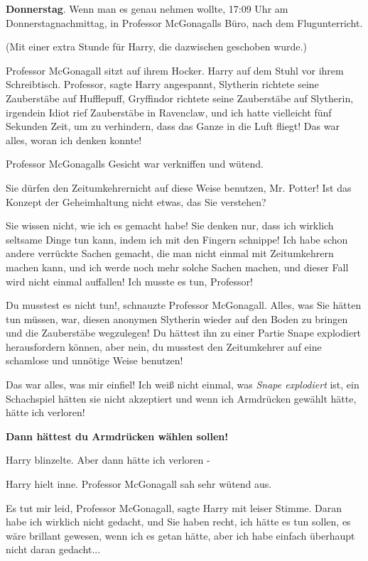 \textbf{Donnerstag}. Wenn man es genau nehmen wollte, 17:09 Uhr am
Donnerstagnachmittag, in Professor McGonagalls Büro, nach dem Flugunterricht.

(Mit einer extra Stunde für Harry, die dazwischen geschoben wurde.)

Professor McGonagall sitzt auf ihrem Hocker. Harry auf dem Stuhl vor ihrem
Schreibtisch. \glqq Professor\grqq{}, sagte Harry angespannt, \glqq Slytherin
richtete seine Zauberstäbe auf Hufflepuff, Gryffindor richtete seine Zauberstäbe
auf Slytherin, irgendein Idiot rief Zauberstäbe in Ravenclaw, und ich hatte
vielleicht fünf Sekunden Zeit, um zu verhindern, dass das Ganze in die Luft
fliegt! Das war alles, woran ich denken konnte!\grqq{}

Professor McGonagalls Gesicht war verkniffen und wütend.

\glqq Sie dürfen den Zeitumkehrernicht auf diese Weise benutzen, Mr. Potter! Ist
das Konzept der Geheimhaltung nicht etwas, das Sie verstehen?\grqq{}

\glqq Sie wissen nicht, wie ich es gemacht habe! Sie denken nur, dass ich
wirklich seltsame Dinge tun kann, indem ich mit den Fingern schnippe! Ich habe
schon andere verrückte Sachen gemacht, die man nicht einmal mit Zeitumkehrern
machen kann, und ich werde noch mehr solche Sachen machen, und dieser Fall wird
nicht einmal auffallen! Ich musste es tun, Professor!\grqq{}

\glqq Du musstest es nicht tun!\grqq{}, schnauzte Professor McGonagall. \glqq
Alles, was Sie hätten tun müssen, war, diesen anonymen Slytherin wieder auf den
Boden zu bringen und die Zauberstäbe wegzulegen! Du hättest ihn zu einer Partie
Snape explodiert herausfordern können, aber nein, du musstest den Zeitumkehrer
auf eine schamlose und unnötige Weise benutzen!\grqq{}

\glqq Das war alles, was mir einfiel! Ich weiß nicht einmal, was \emph{Snape
explodiert} ist, ein Schachspiel hätten sie nicht akzeptiert und wenn ich
Armdrücken gewählt hätte, hätte ich verloren!\grqq{}

\textbf{\glqq Dann hättest du Armdrücken wählen sollen!\grqq{}}

Harry blinzelte. \glqq Aber dann hätte ich verloren -\grqq{}

Harry hielt inne. Professor McGonagall sah sehr wütend aus.

\glqq Es tut mir leid, Professor McGonagall\grqq{}, sagte Harry mit leiser
Stimme. \glqq Daran habe ich wirklich nicht gedacht, und Sie haben recht, ich
hätte es tun sollen, es wäre brillant gewesen, wenn ich es getan hätte, aber ich
habe einfach überhaupt nicht daran gedacht...\grqq{}

